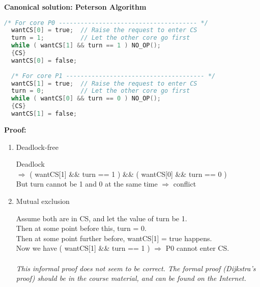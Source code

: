 \documentclass[12pt]{article}
\begin{document}
\textbf{Canonical solution: Peterson Algorithm }
\begin{lstlisting}[language=C]
  /* For core P0 -------------------------------------- */
  wantCS[0] = true;  // Raise the request to enter CS
  turn = 1;          // Let the other core go first 
  while ( wantCS[1] && turn == 1 ) NO_OP();  
  {CS} 
  wantCS[0] = false; 
  
  /* For core P1 -------------------------------------- */
  wantCS[1] = true;  // Raise the request to enter CS
  turn = 0;          // Let the other core go first 
  while ( wantCS[0] && turn == 0 ) NO_OP();  
  {CS} 
  wantCS[1] = false; 
\end{lstlisting} 

\textbf{Proof: }

\begin{enumerate}
\item Deadlock-free 

Deadlock \\ 
$\Rightarrow$ ( wantCS[1] \&\& turn == 1 ) \&\& ( wantCS[0] \&\& turn == 0 ) \\
But turn cannot be 1 and 0 at the same time $\Rightarrow$ conflict 

\item Mutual exclusion 

Assume both are in CS, and let the value of turn be 1.  \\ 
Then at some point before this, turn = 0. \\ 
Then at some point further before, wantCS[1] = true happens. \\
Now we have ( wantCS[1] \&\& turn == 1 ) $\Rightarrow$ P0 cannot enter CS. \\
\\
\textit{This informal proof does not seem to be correct. The formal proof
(Dijkstra's proof) should be
in the course material, and can be found on the Internet.  }
\end{enumerate}



\end{document}
